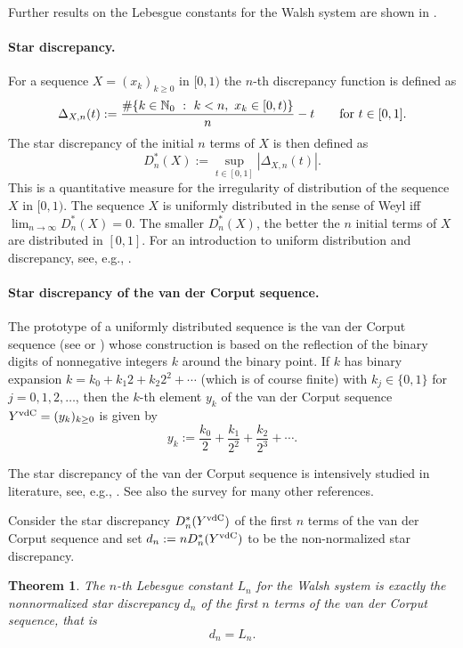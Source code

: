 \documentclass[12pt]{article}
\newtheorem{theorem}{Theorem}
\newcommand{\NN}{{\Bbb N}}
\begin{document}
Further results on the Lebesgue constants for the Walsh system are shown in \cite{AS1,AS2}. 

\paragraph{Star discrepancy.}
For a sequence $X=(x_k)_{k \ge 0}$ in $[0,1)$ the $n$-th discrepancy function is defined as $$\Delta_{X,n}(t) :=\frac{\#\{k \in \NN_0\ : \ k < n,\ x_k \in [0,t)\}}{n}-t \qquad \mbox{for $t \in [0,1]$}.$$ The star discrepancy of the initial $n$ terms of $X$ is then defined as $$D_n^*(X):=\sup_{t \in [0,1]}|\Delta_{X,n}(t)|.$$ This is a quantitative measure for the irregularity of distribution of the sequence $X$ in $[0,1)$. The sequence $X$ is uniformly distributed in the sense of Weyl \cite{weyl} iff $\lim_{n \rightarrow \infty}D_n^{\ast}(X)=0$. The smaller $D_n^{\ast}(X)$, the better the $n$ initial terms of $X$ are distributed in $[0,1]$. For an introduction to uniform distribution and discrepancy, see, e.g., \cite{kuinie}.

\paragraph{Star discrepancy of the van der Corput sequence.}
The prototype of a uniformly distributed sequence is the van der Corput sequence (see \cite{vdc35} or \cite{FKP}) whose construction is based on the reflection of the binary digits of nonnegative integers $k$ around the binary point. If $k$ has binary expansion $k=k_0+k_1 2+k_2 2^2+\cdots$ (which is of course finite) with $k_j \in \{0,1\}$ for $j=0,1,2,\ldots$, then the $k$-th element $y_k$ of the van der Corput sequence $Y^{{\rm vdC}}=(y_k)_{k \ge 0}$ is given by 
\begin{equation*}
y_k :=  \frac{k_0}{2}+\frac{k_1}{2^2}+\frac{k_2}{2^3}+\cdots.
\end{equation*}


The star discrepancy of the van der Corput sequence is intensively studied in literature, see, e.g., \cite{befa,befa77,dlp04,fau1990,hab1966,spi}. See also the survey \cite{FKP} for many other references.

Consider the star discrepancy $D_n^{\ast}(Y^{{\rm vdC}})$ of the first $n$ terms of the van der Corput sequence and set $d_n:=n D_n^{\ast}(Y^{{\rm vdC}})$ to be the non-normalized star discrepancy. 

\begin{theorem}\label{thm2}
The $n$-th Lebesgue constant $L_n$ for the Walsh system is exactly the nonnormalized star discrepancy $d_n$ of the first $n$ terms of the van der Corput sequence, that is $$d_n=L_n.$$ 
\end{theorem}
\end{document}
